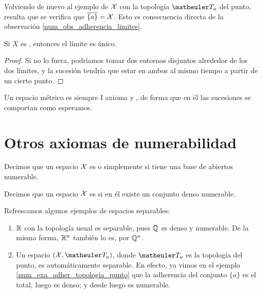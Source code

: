 \begin{exa}
	\label{num_exa_adher_topologia_punto}
	Volviendo de nuevo al ejemplo de $\mathcal{X}$ con la topología $\T_a$ del punto, resulta que se verifica que $\overline{\{a\}}=\mathcal{X}$. Esto es consecuencia directa de la observación \ref{num_obs_adherencia_limites}.
\end{exa}

\begin{prop}
	Si $X$ es \hausdorff, entonces el límite es único.
	
	\begin{proof}
		Si no lo fuera, podríamos tomar dos entornos disjuntos alrededor de los dos límites, y la sucesión tendría que estar en ambos al mismo tiempo a partir de un cierto punto.
	\end{proof}
\end{prop}

\begin{obs}
	Un espacio métrico es siempre I axioma y \hausdorff, de forma que en él las sucesiones se comportan como esperamos.
\end{obs}

\section{Otros axiomas de numerabilidad}

\begin{defi}
	Decimos que un espacio $\mathcal{X}$ es  o simplemente  si tiene una base de abiertos numerable.
\end{defi}

\begin{defi}[Separable]
	Decimos que un espacio $\mathcal{X}$ es  si en él existe un conjunto denso numerable.
\end{defi}

\begin{exa}
	Refrescamos algunos ejemplos de espacios separables:
	\begin{enumerate}
		\item $\mathbb{R}$ con la topología usual es separable, pues $\mathbb{Q}$ es denso y numerable. De la misma forma, $\mathbb{R}^n$ también lo es, por $\mathbb{Q}^n$. 
		
		\item Un espacio $(\X,\T_a)$, donde $\T_a$ es la topología del punto, es automáticamente separable. En efecto, ya vimos en el ejemplo \ref{num_exa_adher_topologia_punto} que la adherencia del conjunto $\{a\}$ es el total, luego es denso; y desde luego es numerable. \qedhere
	\end{enumerate}
\end{exa}

